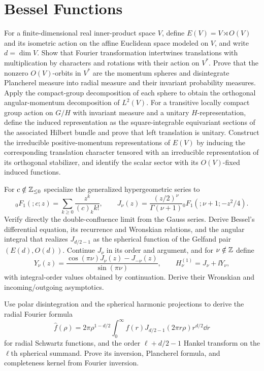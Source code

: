 

\section{Bessel Functions}

\begin{exercise}
For a finite-dimensional real inner-product space $V$, define
$E(V)=V\rtimes O(V)$ and its isometric action on the affine Euclidean space
modeled on $V$, and write $d=\dim V$.  Show that Fourier transformation intertwines translations
with multiplication by characters and rotations with their action on $V^*$.
Prove that the nonzero $O(V)$-orbits in $V^*$ are the momentum spheres and
disintegrate Plancherel measure into radial measure and their invariant
probability measures.  Apply the compact-group decomposition of each sphere
to obtain the orthogonal angular-momentum decomposition of $L^2(V)$.
For a transitive locally compact group action on $G/H$ with invariant measure
and a unitary $H$-representation, define the induced representation as the
square-integrable equivariant sections of the associated Hilbert bundle and
prove that left translation is unitary.
Construct the irreducible positive-momentum representations of $E(V)$ by
inducing the corresponding translation character tensored with an
irreducible representation of its orthogonal stabilizer, and identify the
scalar sector with its $O(V)$-fixed induced functions.
\end{exercise}

\begin{exercise}
For $c\notin\mathbb Z_{\leq0}$ specialize the generalized hypergeometric series to
\[
 {}_0F_1(;c;z)=\sum_{k\geq0}\frac{z^k}{(c)_k k!},
 \qquad
 J_\nu(z)=\frac{(z/2)^\nu}{\Gamma(\nu+1)}
 {}_0F_1(;\nu+1;-z^2/4).
\]
Verify directly the double-confluence limit from the Gauss series.
Derive Bessel's differential equation, its recurrence and Wronskian
relations, and the angular integral that realizes $J_{d/2-1}$ as the
spherical function of the Gelfand pair $(E(d),O(d))$.  Continue $J_\nu$ in
its order and argument, and for $\nu\notin\mathbb Z$ define
\[
 Y_\nu(z)=\frac{\cos(\pi\nu)J_\nu(z)-J_{-\nu}(z)}{\sin(\pi\nu)},
 \qquad H_\nu^{(1)}=J_\nu+\ii Y_\nu,
\]
with integral-order values obtained by continuation.  Derive their Wronskian
and incoming/outgoing asymptotics.

Use polar disintegration and the spherical harmonic projections to derive
the radial Fourier formula
\[
 \widehat f(\rho)=2\pi\rho^{1-d/2}
 \int_0^\infty f(r)J_{d/2-1}(2\pi r\rho)r^{d/2}\dd r
\]
for radial Schwartz functions, and the order
$\ell+d/2-1$ Hankel transform on the $\ell$th spherical summand.  Prove its
inversion, Plancherel formula, and completeness kernel from Fourier inversion.
\end{exercise}

